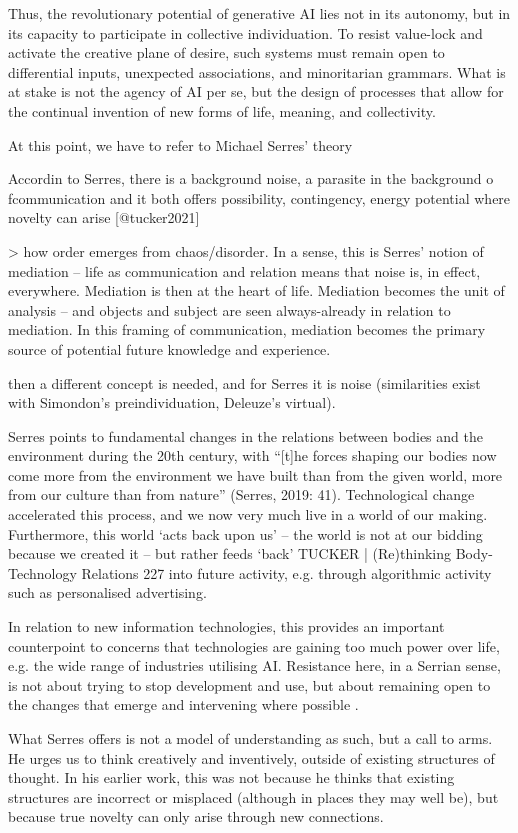 Thus, the revolutionary potential of generative AI lies not in its autonomy, but in its capacity to participate in collective individuation. To resist value-lock and activate the creative plane of desire, such systems must remain open to differential inputs, unexpected associations, and minoritarian grammars. What is at stake is not the agency of AI per se, but the design of processes that allow for the continual invention of new forms of life, meaning, and collectivity.

\begin{orangebox}
	At this point, we have to refer to Michael Serres' theory


	Accordin to Serres, there is a background noise, a parasite in the background o fcommunication and it both offers possibility, contingency, energy potential where novelty can arise [@tucker2021]

	> how order emerges from chaos/disorder. In a sense,  this is Serres’ notion of mediation – life as communication and relation means that  noise is, in effect, everywhere. Mediation is then at the heart of life. Mediation becomes  the unit of analysis – and objects and subject are seen always-already in relation to  mediation. In this framing of communication, mediation becomes the primary source  of potential future knowledge and experience.


	then a different concept is needed, and for  Serres it is noise (similarities exist with Simondon’s preindividuation, Deleuze’s virtual).

	Serres  points to fundamental changes in the relations between bodies and the environment  during the 20th century, with “[t]he forces shaping our bodies now come more from  the environment we have built than from the given world, more from our culture than  from nature” (Serres, 2019: 41). Technological change accelerated this process, and we  now very much live in a world of our making. Furthermore, this world ‘acts back upon  us’ – the world is not at our bidding because we created it – but rather feeds ‘back’ TUCKER | (Re)thinking Body-Technology Relations  227  into future activity, e.g. through algorithmic activity such as personalised advertising.


	In relation to new information technologies, this  provides an important counterpoint to concerns that technologies are gaining too  much power over life, e.g. the wide range of industries utilising AI. Resistance here, in a Serrian sense, is not about trying to stop development and use, but about remaining  open to the changes that emerge and intervening where possible \parencite[227-228]{tucker2021a} .


	What Serres offers is not a model of understanding as such, but a call to arms. He  urges us to think creatively and inventively, outside of existing structures of thought.  In his earlier work, this was not because he thinks that existing structures are incorrect  or misplaced (although in places they may well be), but because true novelty can only  arise through new connections.
\end{orangebox}



